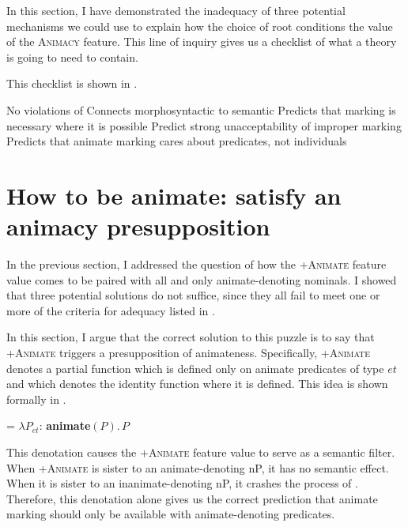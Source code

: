 \documentclass[output=paper
,newtxmath
,modfonts
,nonflat]{langsci/langscibook}
\begin{document}
In this section, I have demonstrated the inadequacy of three potential mechanisms we could use to explain how the choice of root conditions the value of the \textsc{Animacy} feature.  This line of inquiry gives us a checklist of what a theory is going to need to contain.  

This checklist is shown in .

\ea\label{ex:pesetsky:checklist} \ea No violations of  \label{ex:pesetsky:checklista}
\ex\label{ex:pesetsky:checklistb}  Connects morphosyntactic  to semantic  
\ex\label{ex:pesetsky:checklistc}  Predicts that  marking is necessary where it is possible 
\ex\label{ex:pesetsky:checklistd} Predict strong unacceptability of improper  marking 
\ex\label{ex:pesetsky:checkliste} Predicts that animate marking cares about predicates, not individuals \\ \z \z

\section{How to be animate: satisfy an animacy presupposition} \label{sec:pesetsky:satisfyapresupposition}

In the previous section, I addressed the question of how the +\textsc{Animate} feature value comes to be paired with all and only animate-denoting nominals.  I showed that three potential solutions do not suffice, since they all fail to meet one or more of the criteria for adequacy listed in .

In this section, I argue that the correct solution to this puzzle is to say that +\textsc{Animate} triggers a presupposition of animateness.  Specifically, +\textsc{Animate} denotes a partial function which is defined only on animate predicates of type $et$ and which denotes the identity function where it is defined.  This idea is shown formally in .
 
\ea\label{ex:pesetsky:lambdas}  = $\lambda P_{et}: \,$\textbf{animate}$(P).\,P$ \z

This denotation causes the +\textsc{Animate} feature value to serve as a semantic filter.  When +\textsc{Animate} is sister to an animate-denoting nP, it has no semantic effect.  When it is sister to an inanimate-denoting nP, it crashes the process of . Therefore, this denotation alone gives us the correct prediction that animate marking should only be available with animate-denoting predicates.
\end{document}
